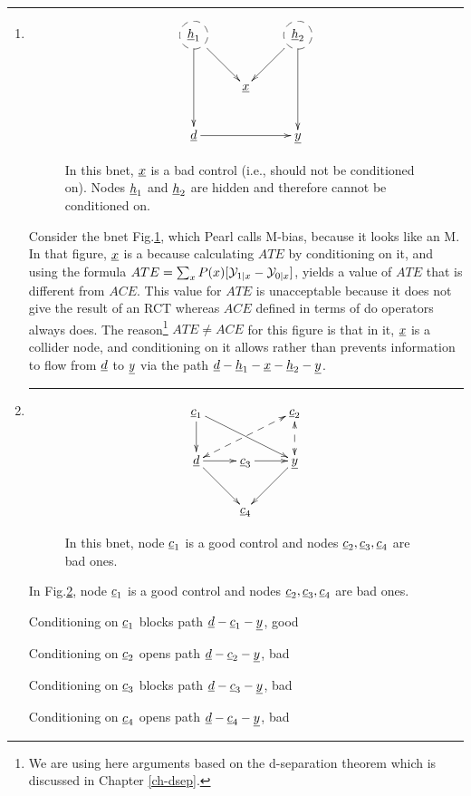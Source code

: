 \hrule
\begin{enumerate}
\item
\begin{figure}[h!]
$$
\xymatrix{
*++[F-o]{\rvh_1} \ar[dd]\ar[dr]
&
& *++[F-o]{\rvh_2}  \ar[dd]\ar[dl]
\\
& \rvx
\\
\rvd \ar[rr]
&&\rvy
}$$
\caption{In this bnet,
$\rvx$ is a bad control
(i.e., should
not be conditioned on).
Nodes $\rvh_1$
and $\rvh_2$ are
hidden and therefore
cannot be conditioned on.}
\label{fig-po-m-bias}
\end{figure}

Consider the
bnet Fig.\ref{fig-po-m-bias},
which  Pearl calls M-bias,
because it looks like an M.
In that figure,
$\rvx$
is a 
because
calculating
$ATE$ by conditioning on it,
and using the formula
$ATE=\sum_x
 P(x)[{\cal Y}_{1|x}-{\cal Y}_{0|x}]$,
yields a value of $ATE$
that is different from
$ACE$. This value for $ATE$
is unacceptable
because it does
not give the result of an RCT
whereas $ACE$ defined
in terms of do operators
always does.
The reason\footnote{We are
using here arguments
based on the d-separation
theorem
which is discussed in Chapter
\ref{ch-dsep}.} $ATE\neq ACE$
for this figure
is that in it,
$\rvx$ is
a collider node,
and conditioning
on it allows
rather than
prevents information
to flow from $\rvd$
to $\rvy$
via the path
$\rvd-\rvh_1-\rvx-\rvh_2-\rvy$.

\hrule
\item

\begin{figure}[h!]
$$
\xymatrix{
\rvc_1\ar[d]\ar[drr]
&&\rvc_2\ar@{<-->}[d]
\ar@{<-->}[dll]
\\
\rvd\ar[r]\ar[dr]
&\rvc_3\ar[r]
&\rvy\ar[dl]
\\
&\rvc_4
}$$
\caption{In this bnet,
node $\rvc_1$ is a good
control and nodes $\rvc_2, \rvc_3, \rvc_4$
are bad ones.}
\label{fig-po-1-good-3-bad}
\end{figure}

In Fig.\ref{fig-po-1-good-3-bad}, node
$\rvc_1$ is a good
control and nodes $\rvc_2, \rvc_3, \rvc_4$
are bad ones.

Conditioning on $\rvc_1$ blocks path $\rvd-\rvc_1-\rvy$, good

Conditioning on $\rvc_2$ opens path $\rvd-\rvc_2-\rvy$, bad

Conditioning on $\rvc_3$ blocks path $\rvd-\rvc_3-\rvy$, bad

Conditioning on $\rvc_4$ opens path $\rvd-\rvc_4-\rvy$, bad


\end{enumerate}
